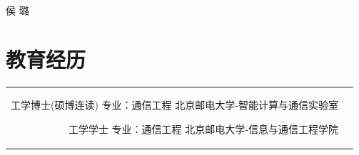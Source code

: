 \documentclass[10pt]{article} %
\begin{document}
\begin{paracol}{2} %
	
	
	\parbox[top][0.12\textheight][c]{\linewidth}{ %
		\vspace{-0.04\textheight} %
		\centering %
		{\Huge{ 侯 璐}}\\\medskip %
		{\Huge{}}
	}
	\section{教育经历} 
	
	
	
	
	
	\begin{supertabular}{rl} %
		
		
		{工学博士(硕博连读)} %
		{专业：通信工程} %
		{} %
		{北京邮电大学-智能计算与通信实验室} %
		
		
		{工学学士} %
		{专业：通信工程} %
		{} %
		{北京邮电大学-信息与通信工程学院} %
		

\end{supertabular}
\end{paracol}
\end{document}
